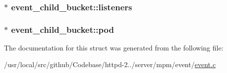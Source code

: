 \subsubsection[{\texorpdfstring{listeners}{listeners}}]{$\ast$ event\+\_\+child\+\_\+bucket\+::listeners}\hypertarget{structevent__child__bucket_ab78166c7d3cbebb370aedf8951336654}{}\label{structevent__child__bucket_ab78166c7d3cbebb370aedf8951336654}
\subsubsection[{\texorpdfstring{pod}{pod}}]{$\ast$ event\+\_\+child\+\_\+bucket\+::pod}\hypertarget{structevent__child__bucket_ab442f245214d6b844979949674946770}{}\label{structevent__child__bucket_ab442f245214d6b844979949674946770}


The documentation for this struct was generated from the following file\+:\begin{DoxyCompactItemize}
\item 
/usr/local/src/github/\+Codebase/httpd-\/2../server/mpm/event/\hyperlink{event_8c}{event.\+c}\end{DoxyCompactItemize}
